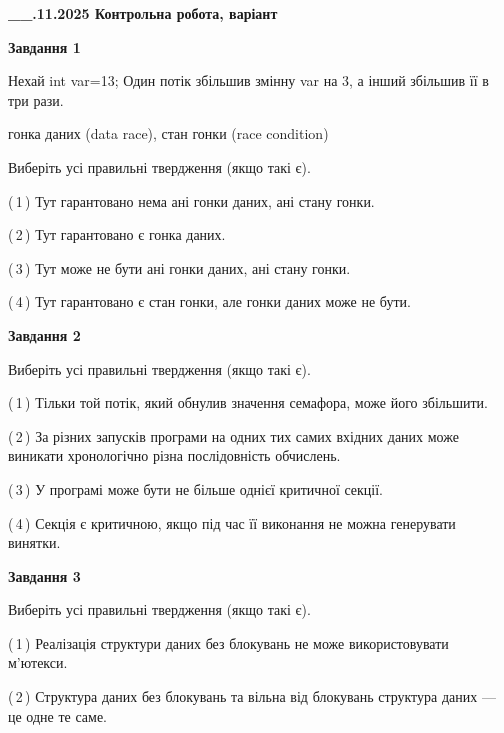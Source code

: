 \documentclass[12pt, ukrainian]{article}
\begin{document}
\begin {large}

\textbf{\_\_.11.2025 Контрольна робота, варіант  }\par


{

\begin{center}
\textbf{Завдання 1}
\end{center}
Нехай int var=13; Один потік збільшив змінну var на 3, а інший збільшив її в три рази.

гонка даних (data race), стан гонки (race condition)

Виберіть усі правильні твердження (якщо такі є).\par
\vspace{2mm}
(\,1\,) Тут гарантовано нема ані гонки даних, ані стану гонки.%

(\,2\,) Тут гарантовано є гонка даних.%

(\,3\,) Тут може не бути ані гонки даних, ані стану гонки.%

(\,4\,) Тут гарантовано є стан гонки, але гонки даних може не бути.%



\begin{center}
\textbf{Завдання 2}
\end{center}
Виберіть усі правильні твердження (якщо такі є).\par
\vspace{2mm}

(\,1\,) Тільки той потік, який обнулив значення семафора, може його збільшити.%

(\,2\,) За різних запусків програми на одних тих самих вхідних даних може виникати хронологічно різна послідовність обчислень.%

(\,3\,) У програмі може бути не більше однієї критичної секції.%

(\,4\,) Секція є критичною, якщо під час її виконання не можна генерувати винятки.%



\begin{center}
\textbf{Завдання 3}
\end{center}
Виберіть усі правильні твердження (якщо такі є).\par
\vspace{2mm}

(\,1\,) Реалізація структури даних без блокувань не може використовувати м’ютекси.%

(\,2\,) Структура даних без блокувань та вільна від блокувань структура даних --- це одне те саме.%

}
\end{large}
\end{document}
